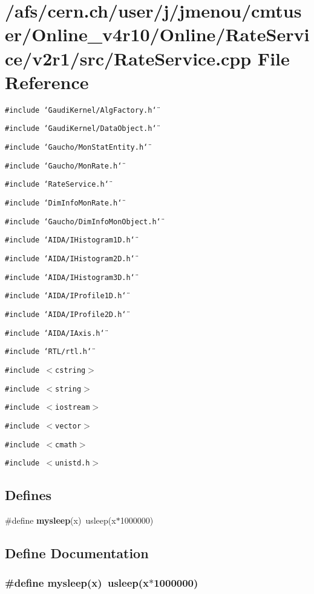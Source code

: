 \section{/afs/cern.ch/user/j/jmenou/cmtuser/Online\_\-v4r10/Online/Rate\-Service/v2r1/src/Rate\-Service.cpp File Reference}
\label{RateService_8cpp}
{\tt \#include \char`\"{}Gaudi\-Kernel/Alg\-Factory.h\char`\"{}}\par
{\tt \#include \char`\"{}Gaudi\-Kernel/Data\-Object.h\char`\"{}}\par
{\tt \#include \char`\"{}Gaucho/Mon\-Stat\-Entity.h\char`\"{}}\par
{\tt \#include \char`\"{}Gaucho/Mon\-Rate.h\char`\"{}}\par
{\tt \#include \char`\"{}Rate\-Service.h\char`\"{}}\par
{\tt \#include \char`\"{}Dim\-Info\-Mon\-Rate.h\char`\"{}}\par
{\tt \#include \char`\"{}Gaucho/Dim\-Info\-Mon\-Object.h\char`\"{}}\par
{\tt \#include \char`\"{}AIDA/IHistogram1D.h\char`\"{}}\par
{\tt \#include \char`\"{}AIDA/IHistogram2D.h\char`\"{}}\par
{\tt \#include \char`\"{}AIDA/IHistogram3D.h\char`\"{}}\par
{\tt \#include \char`\"{}AIDA/IProfile1D.h\char`\"{}}\par
{\tt \#include \char`\"{}AIDA/IProfile2D.h\char`\"{}}\par
{\tt \#include \char`\"{}AIDA/IAxis.h\char`\"{}}\par
{\tt \#include \char`\"{}RTL/rtl.h\char`\"{}}\par
{\tt \#include $<$cstring$>$}\par
{\tt \#include $<$string$>$}\par
{\tt \#include $<$iostream$>$}\par
{\tt \#include $<$vector$>$}\par
{\tt \#include $<$cmath$>$}\par
{\tt \#include $<$unistd.h$>$}\par
\subsection*{Defines}
\begin{CompactItemize}
\item 
\#define {\bf mysleep}(x)~usleep(x$\ast$1000000)
\end{CompactItemize}


\subsection{Define Documentation}
\subsubsection{\setlength{\rightskip}{0pt plus 5cm}\#define mysleep(x)~usleep(x$\ast$1000000)}\label{RateService_8cpp_a0}


